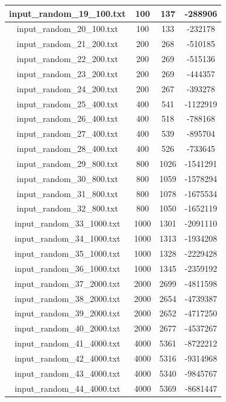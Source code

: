 \begin{longtable}{|c|c|c|c|}
		input\_random\_19\_100.txt & 100 & 137 & -288906 \\ \hline
		input\_random\_20\_100.txt & 100 & 133 & -232178 \\ \hline
		input\_random\_21\_200.txt & 200 & 268 & -510185 \\ \hline
		input\_random\_22\_200.txt & 200 & 269 & -515136 \\ \hline
		input\_random\_23\_200.txt & 200 & 269 & -444357 \\ \hline
		input\_random\_24\_200.txt & 200 & 267 & -393278 \\ \hline
		input\_random\_25\_400.txt & 400 & 541 & -1122919 \\ \hline
		input\_random\_26\_400.txt & 400 & 518 & -788168 \\ \hline
		input\_random\_27\_400.txt & 400 & 539 & -895704 \\ \hline
		input\_random\_28\_400.txt & 400 & 526 & -733645 \\ \hline
		input\_random\_29\_800.txt & 800 & 1026 & -1541291 \\ \hline
		input\_random\_30\_800.txt & 800 & 1059 & -1578294 \\ \hline
		input\_random\_31\_800.txt & 800 & 1078 & -1675534 \\ \hline
		input\_random\_32\_800.txt & 800 & 1050 & -1652119 \\ \hline
		input\_random\_33\_1000.txt & 1000 & 1301 & -2091110 \\ \hline
		input\_random\_34\_1000.txt & 1000 & 1313 & -1934208 \\ \hline
		input\_random\_35\_1000.txt & 1000 & 1328 & -2229428 \\ \hline
		input\_random\_36\_1000.txt & 1000 & 1345 & -2359192 \\ \hline
		input\_random\_37\_2000.txt & 2000 & 2699 & -4811598 \\ \hline
		input\_random\_38\_2000.txt & 2000 & 2654 & -4739387 \\ \hline
		input\_random\_39\_2000.txt & 2000 & 2652 & -4717250 \\ \hline
		input\_random\_40\_2000.txt & 2000 & 2677 & -4537267 \\ \hline
		input\_random\_41\_4000.txt & 4000 & 5361 & -8722212 \\ \hline
		input\_random\_42\_4000.txt & 4000 & 5316 & -9314968 \\ \hline
		input\_random\_43\_4000.txt & 4000 & 5340 & -9845767 \\ \hline
		input\_random\_44\_4000.txt & 4000 & 5369 & -8681447 \\ \hline

\end{longtable}
